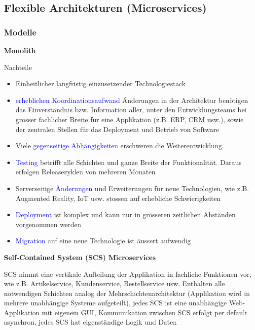 \subsection{Flexible Architekturen (Microservices)}

\subsubsection{Modelle}

\textbf{Monolith}

Nachteile
\begin{itemize}
    \item Einheitlicher langfristig einzusetzender Technologiestack
    \item \textcolor{blue}{erheblichen Koordinationsaufwand} Änderungen in der Architektur benötigen das Einverständnis bzw. Information aller, unter den Entwicklungsteams bei grosser fachlicher Breite für eine Applikation (z.B. ERP, CRM usw.), sowie der zentralen Stellen für das Deployment und Betrieb von Software
    \item Viele \textcolor{blue}{gegenseitige Abhängigkeiten} erschweren die Weiterentwicklung.
    \item \textcolor{blue}{Testing} betrifft alle Schichten und ganze Breite der Funktionalität. Daraus erfolgen Releasezyklen von mehreren Monaten
    \item Serverseitige \textcolor{blue}{Änderungen} und Erweiterungen für neue Technologien, wie z.B. Augmented Reality, IoT usw. stossen auf erhebliche Schwierigkeiten
    \item \textcolor{blue}{Deployment} ist komplex und kann nur in grösseren zeitlichen Abständen vorgenommen werden
    \item \textcolor{blue}{Migration} auf eine neue Technologie ist äussert
    aufwendig
\end{itemize}
\vspace{10pt}
\textbf{Self-Contained System (SCS) Microservices}

SCS nimmt eine vertikale Aufteilung der Applikation in fachliche Funktionen vor, wie z.B. Artikelservice, Kundenservice, Bestellservice usw. Enthalten alle notwendigen Schichten analog der Mehrschichtenarchitektur (Applikation wird in mehrere unabhängige Systeme aufgeteilt), jedes SCS ist eine unabhängige Web-Applikation mit eigenem GUI, Kommunikation zwischen SCS erfolgt per default asynchron, jedes SCS hat eigenständige Logik und Daten \\

